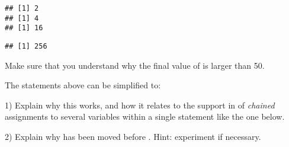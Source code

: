 \documentclass[krantz2]{krantz}\usepackage{knitr}%
\begin{document}
\begin{knitrout}\footnotesize
{}\color{fgcolor}\begin{kframe}
\begin{alltt}
 \hlkwb{<-} 
  \hlopt{<} \hlstd{) \{} \hlkwb{<-} \hlopt{^}\hlstd{\}}
\end{alltt}
\begin{verbatim}
## [1] 2
## [1] 4
## [1] 16
\end{verbatim}
\begin{alltt}
\end{alltt}
\begin{verbatim}
## [1] 256
\end{verbatim}
\end{kframe}
\end{knitrout}

\begin{playground}
Make sure that you understand why the final value of  is larger than 50.
\end{playground}


\begin{advplayground}
The statements above can be simplified to:

\begin{knitrout}\footnotesize
{}\color{fgcolor}\begin{kframe}
\begin{alltt}
 \hlkwb{<-} 
  \hlopt{<} \hlstd{) \{} \hlkwb{<-} \hlopt{^}\hlstd{)\}}
\end{alltt}
\end{kframe}
\end{knitrout}

1) Explain why this works, and how it relates to the support in \Rlang of \emph{chained} assignments to several variables within a single statement like the one below.

\begin{knitrout}\footnotesize
{}\color{fgcolor}\begin{kframe}
\begin{alltt}
 \hlkwb{<-}  \hlkwb{<-}  \hlkwb{<-} \hlopt{:}
\end{alltt}
\end{kframe}
\end{knitrout}

2) Explain why  has been moved before . Hint: experiment if necessary.
\end{advplayground}
\end{document}
